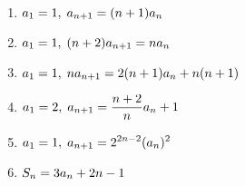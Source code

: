 \documentclass[a4paper]{ltjsarticle}
\begin{document}
\begin{question*}
\begin{enumerate}[label=\arabic*.]
  \item $\displaystyle a_1 = 1,\; a_{n+1}=(n+1)a_n$\\

  \item $\displaystyle a_1 = 1,\; (n+2)a_{n+1}=na_n$\\

  \item $\displaystyle a_1 = 1,\; na_{n+1}=2(n+1)a_n+n(n+1)$\\

  \item $\displaystyle a_1 = 2,\; a_{n+1} = \frac{n+2}{n} a_n + 1$\\

  \item $\displaystyle a_1 = 1,\; a_{n+1} = 2^{2n-2}(a_n)^2$\\

  \item $\displaystyle S_n = 3a_n + 2n - 1$

\end{enumerate}
\end{question*}
\end{document}
